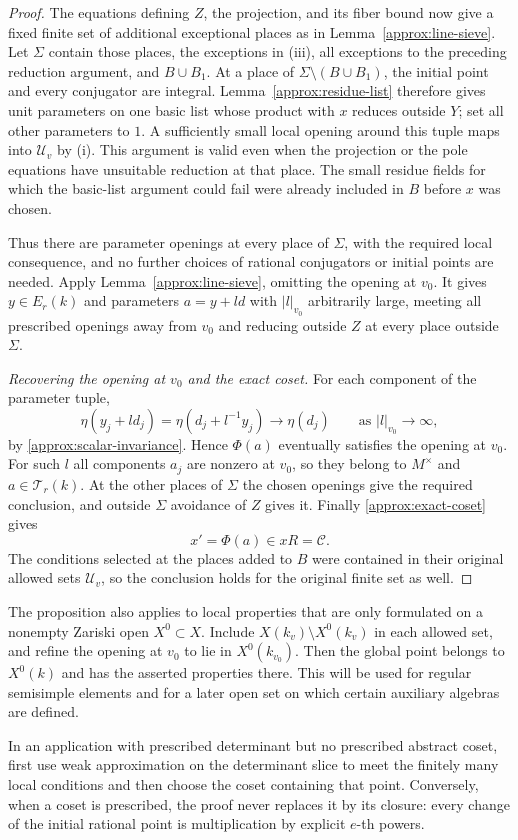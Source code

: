 \begin{proof}
The equations defining $Z$, the projection, and its fiber
bound now give a fixed finite set of additional exceptional
places as in Lemma~\ref{approx:line-sieve}.  Let $\Sigma$
contain those places, the exceptions in \textup{(iii)},
all exceptions to the preceding reduction argument, and
$B\cup B_1$.  At a place of
$\Sigma\setminus(B\cup B_1)$, the initial point and every
conjugator are integral.  Lemma~\ref{approx:residue-list}
therefore gives unit parameters on one basic list whose
product with $x$ reduces outside $Y$; set all other
parameters to $1$.  A sufficiently small local opening
around this tuple maps into $\mathcal U_v$ by
\textup{(i)}.  This argument is valid even when the
projection or the pole equations have unsuitable
reduction at that place.  The small residue fields for
which the basic-list argument could fail were already
included in $B$ before $x$ was chosen.

Thus there are parameter openings at every place of
$\Sigma$, with the required local consequence, and no
further choices of rational conjugators or initial points
are needed.  Apply Lemma~\ref{approx:line-sieve}, omitting
the opening at $v_0$.  It gives $y\in E_r(k)$ and
parameters $a=y+ld$ with $|l|_{v_0}$ arbitrarily large,
meeting all prescribed openings away from $v_0$ and
reducing outside $Z$ at every place outside $\Sigma$.

\emph{Recovering the opening at $v_0$ and the exact coset.}
For each component of the parameter tuple,
\[
 \eta(y_j+ld_j)
    =\eta(d_j+l^{-1}y_j)
    \longrightarrow\eta(d_j)
       \qquad\text{as }|l|_{v_0}\longrightarrow\infty,
\]
by \eqref{approx:scalar-invariance}.  Hence $\Phi(a)$
eventually satisfies the opening at $v_0$.  For such $l$
all components $a_j$ are nonzero at $v_0$, so they belong
to $M^\times$ and $a\in\mathcal T_r(k)$.
At the other places of $\Sigma$ the chosen openings give
the required conclusion, and outside $\Sigma$ avoidance
of $Z$ gives it.  Finally \eqref{approx:exact-coset} gives
\[
                       x'=\Phi(a)\in xR=\mathcal C.
\]
The conditions selected at the places added to $B$ were
contained in their original allowed sets $\mathcal U_v$,
so the conclusion holds for the original finite set as
well.
\end{proof}

\begin{remark}\label{approx:open-locus}
The proposition also applies to local properties that are
only formulated on a nonempty Zariski open $X^0\subset X$.
Include $X(k_v)\setminus X^0(k_v)$ in each allowed set,
and refine the opening at $v_0$ to lie in $X^0(k_{v_0})$.
Then the global point belongs to $X^0(k)$ and has the
asserted properties there.  This will be used for regular
semisimple elements and for a later open set on which
certain auxiliary algebras are defined.

In an application with prescribed determinant but no
prescribed abstract coset, first use weak approximation
on the determinant slice to meet the finitely many local
conditions and then choose the coset containing that
point.  Conversely, when a coset is prescribed, the proof
never replaces it by its closure: every change of the
initial rational point is multiplication by explicit
$e$-th powers.
\end{remark}
